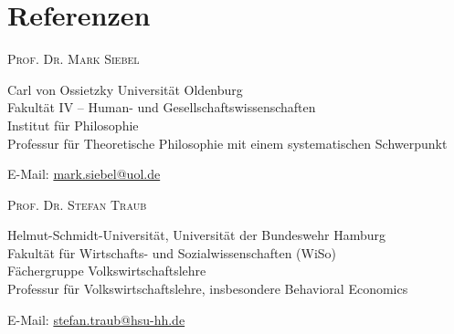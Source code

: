 \documentclass[a4paper,10pt]{article}
\begin{document}
\clearpage
\section{Referenzen}
\textsc{Prof\hspace{0.5pt}. Dr\hspace{0.5pt}. Mark Siebel}

Carl von Ossietzky Universität Oldenburg\\
Fakultät IV -- Human- und Gesellschaftswissenschaften\\
Institut für Philosophie\\
Professur für Theoretische Philosophie mit einem systematischen Schwerpunkt

E-Mail: \href{mailto:mark.siebel@uol.de}{mark.siebel@uol.de}\vspace{12pt}

\textsc{Prof\hspace{0.5pt}. Dr\hspace{0.5pt}. Stefan Traub}

Helmut-Schmidt-Universität, Universität der Bundeswehr Hamburg\\
Fakultät für Wirtschafts- und Sozialwissenschaften (WiSo)\\
Fächergruppe Volkswirtschaftslehre\\
Professur für Volkswirtschaftslehre, insbesondere Behavioral Economics

E-Mail: \href{mailto:stefan.traub@hsu-hh.de}{stefan.traub@hsu-hh.de}\vspace{12pt}
\end{document}
